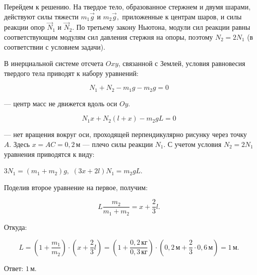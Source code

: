 \documentclass[12pt,a4paper]{article}
\begin{document}
{Перейдем к решению. На твердое тело, образованное стержнем и двумя шарами, действуют силы тяжести $m_1\vec g$ и $m_2\vec g,$ приложенные к центрам шаров, и силы реакции опор $\vec N_1$ и $\vec N_2.$ По третьему закону Ньютона, модули сил реакции равны соответствующим модулям сил давления стержня на опоры, поэтому $N_2 = 2N_1$ (в соответствии с условием задачи).
\begin{center}\end{center}
В инерциальной системе отсчета $Oxy$, связанной с Землей, условия равновесия твердого тела приводят к набору уравнений:

\[N_1 + N_2 - m_1g - m_2g = 0\]

  — центр масс не движется вдоль оси $Oy$.

\[N_1x + N_2 ( l + x ) - m_2gL = 0\]

  — нет вращения вокруг оси, проходящей перпендикулярно рисунку через точку $A$.
 Здесь $x = AC = 0{,}2\,\text{м}$  — плечо силы реакции $N_{1}$.
 С учетом условия $N_2 = 2N_1$ уравнения приводятся к виду:

$3N_1 = ( m_1 + m_2 ) g,$
$( 3x + 2l ) N_1 = m_2gL.$

 Поделив второе уравнение на первое, получим:

\[L \frac{m_2}{m_1 + m_2} = x + \frac{2}{3} l.\]

 Откуда:

\[L = ( 1 + \frac{m_1}{m_2} ) \cdot ( x + \frac{2}{3} l ) = ( 1 + \frac{0{,}2\,\text{кг}}{0{,}3\,\text{кг}} ) \cdot ( 0{,}2\,\text{м} + \frac{2}{3} \cdot 0{,}6\,\text{м} ) = 1\,\text{м}.\]

Ответ: $1\,\text{м}$.
}
\end{document}
